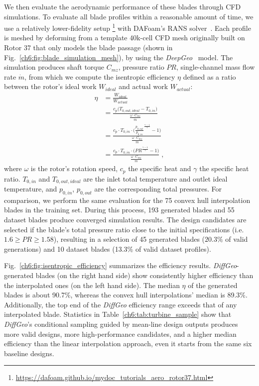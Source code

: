 We then evaluate the aerodynamic performance of these blades through CFD simulations. To evaluate all blade profiles within a reasonable amount of time, we use a relatively lower-fidelity setup \footnote{\url{https://dafoam.github.io/mydoc_tutorials_aero_rotor37.html}} with DAFoam's RANS solver~\cite{aa.He2020}. Each profile is meshed by deforming from a template 40k-cell CFD mesh originally built on Rotor 37 that only models the blade passage (shown in Fig.~\ref{ch6:fig:blade_simulation_mesh}), by using the \textit{DeepGeo}~\cite{aa.Wei2024b,aa.Wei2025} model. The simulation produces shaft torque $C_{mz}$, pressure ratio $PR$, single-channel mass flow rate $\dot m$, from which we compute the isentropic efficiency $\eta$ defined as a ratio between the rotor's ideal work $W_{ideal}$ and actual work $W_{actual}$:
\begin{align}
    \eta &= \frac{W_{ideal}}{W_{actual}} \nonumber \\
         &= \frac{c_p\bigl(T_{0,out,ideal}-T_{0,in}\bigr)}{\frac{\omega \cdot C_{mz}}{\dot m}} \nonumber \\
         &= \frac{c_p \cdot T_{0,in} \cdot \bigl(\frac{p_{0,out}}{p_{0,in}}^\frac{\gamma-1}{\gamma}-1\bigr)}{\frac{\omega \cdot C_{mz}}{\dot m}}\\
         &= \frac{c_p \cdot T_{0,in} \cdot \bigl({PR}^\frac{\gamma-1}{\gamma}-1\bigr)}{\frac{\omega \cdot C_{mz}}{\dot m}}\;, \nonumber
\end{align}
where $\omega$ is the rotor’s rotation speed, $c_p$ the specific heat and $\gamma$ the specific heat ratio. $T_{0,in}$ and $T_{0,out,ideal}$ are the inlet total temperature and outlet ideal temperature, and $p_{0,in}$, $p_{0,out}$ are the corresponding total pressures. For comparison, we perform the same evaluation for the 75 convex hull interpolation blades in the training set. During this process, 193 generated blades and 55 dataset blades produce converged simulation results. The design candidates are selected if the blade's total pressure ratio close to the initial specifications (i.e. $1.6\geq {PR} \geq 1.58$), resulting in a selection of 45 generated blades ($20.3\%$ of valid generations) and 10 dataset blades (13.3\% of valid dataset profiles).



Fig.~\ref{ch6:fig:isentropic_efficiency} summarizes the efficiency results. \textit{DiffGeo}-generated blades (on the right hand side) show consistently higher efficiency than the interpolated ones (on the left hand side). The median $\eta$ of the generated blades is about 90.7\%, whereas the convex hull interpolations’ median is 89.3\%. Additionally, the top end of the \textit{DiffGeo} efficiency range exceeds that of any interpolated blade. Statistics in Table~\ref{ch6:tab:turbine_sample} show that \textit{DiffGeo}’s conditional sampling guided by mean-line design outputs produces more valid designs, more high-performance candidates, and a higher median efficiency than the linear interpolation approach, even it starts from the same six baseline designs.

